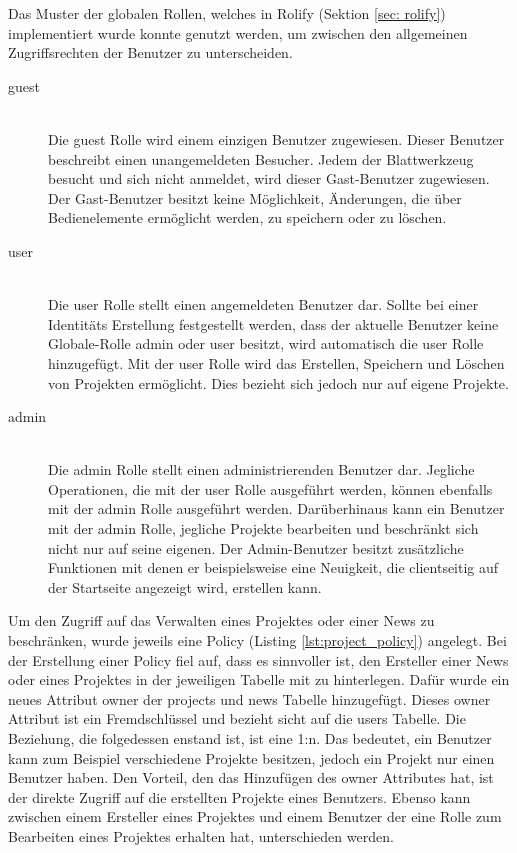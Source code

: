 Das Muster der globalen Rollen, welches in Rolify (Sektion \ref{sec: rolify}) implementiert wurde konnte genutzt werden, um zwischen den allgemeinen Zugriffsrechten der Benutzer zu unterscheiden.

\begin{description}
	\item[guest]\hfill\\
	Die guest Rolle wird einem einzigen Benutzer zugewiesen. Dieser Benutzer beschreibt einen unangemeldeten Besucher. Jedem der Blattwerkzeug besucht und sich nicht anmeldet, wird dieser Gast-Benutzer zugewiesen. Der Gast-Benutzer besitzt keine Möglichkeit, Änderungen, die über Bedienelemente ermöglicht werden, zu speichern oder zu löschen.
	\item[user]\hfill\\
	Die user Rolle stellt einen angemeldeten Benutzer dar. Sollte bei einer Identitäts Erstellung festgestellt werden, dass der aktuelle Benutzer keine Globale-Rolle admin oder user besitzt, wird automatisch die user Rolle hinzugefügt. Mit der user Rolle wird das Erstellen, Speichern und Löschen von Projekten ermöglicht. Dies bezieht sich jedoch nur auf eigene Projekte.
	\item[admin]\hfill\\
	Die admin Rolle stellt einen administrierenden Benutzer dar. Jegliche Operationen, die mit der user Rolle ausgeführt werden, können ebenfalls mit der admin Rolle ausgeführt werden. Darüberhinaus kann ein Benutzer mit der admin Rolle, jegliche Projekte bearbeiten und beschränkt sich nicht nur auf seine eigenen. Der Admin-Benutzer besitzt zusätzliche Funktionen mit denen er beispielsweise eine Neuigkeit, die clientseitig auf der Startseite angezeigt wird, erstellen kann.
\end{description}

Um den Zugriff auf das Verwalten eines Projektes oder einer News zu beschränken, wurde jeweils eine Policy (Listing \ref{lst:project_policy}) angelegt. Bei der Erstellung einer Policy fiel auf, dass es sinnvoller ist, den Ersteller einer News oder eines Projektes in der jeweiligen Tabelle mit zu hinterlegen. Dafür wurde ein neues Attribut owner der projects und news Tabelle hinzugefügt. Dieses owner Attribut ist ein Fremdschlüssel und bezieht sicht auf die users Tabelle. Die Beziehung, die folgedessen enstand ist, ist eine 1:n. Das bedeutet, ein Benutzer kann zum Beispiel verschiedene Projekte besitzen, jedoch ein Projekt nur einen Benutzer haben. Den Vorteil, den das Hinzufügen des owner Attributes hat, ist der direkte Zugriff auf die erstellten Projekte eines Benutzers. Ebenso kann zwischen einem Ersteller eines Projektes und einem Benutzer der eine Rolle zum Bearbeiten eines Projektes erhalten hat, unterschieden werden.

